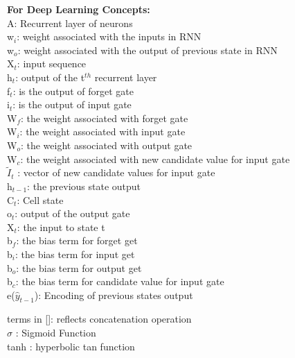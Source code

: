 {\bf For Deep Learning Concepts:}\\
A: Recurrent layer of neurons\\
w$_{i}$:  weight associated with the inputs in RNN\\
w$_{o}$:  weight associated with the output of previous state in RNN\\
X$_{t}$: input sequence\\
h$_{t}$: output of the t$^{th}$ recurrent layer\\
f$_{t}$: is the output of forget gate\\
i$_{t}$: is the output of input gate\\
W$_{f}$: the weight associated with forget gate\\
W$_{i}$: the weight associated with input gate\\
W$_{o}$: the weight associated with output gate\\
W$_{c}$: the weight associated with new candidate value for input gate\\
$\tilde{I}_{t}$ : vector of new candidate values for input gate\\
h$_{t-1}$: the previous state output\\
C$_{t}$: Cell state\\
o$_{t}$: output of the output gate\\
X$_{t}$: the input to state t\\
b$_{f}$: the bias term for forget get\\
b$_{i}$: the bias term for input get\\
b$_{o}$: the bias term for output get\\
b$_{c}$: the bias term for candidate value for input gate\\
e($\hat{y}_{t-1}$): Encoding of previous states output

terms in []: reflects concatenation operation\\
$\sigma$ : Sigmoid Function\\
tanh : hyperbolic tan function\\

